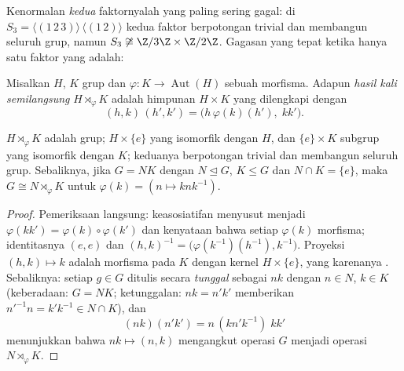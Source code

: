 Kenormalan \emph{kedua} faktornyalah yang paling sering gagal: di $S_3
= \langle (1\,2\,3)\rangle \,\langle(1\,2)\rangle$ kedua faktor
berpotongan trivial dan membangun seluruh grup, namun $S_3 \not\cong \Z/3\Z \times
\Z/2\Z$. Gagasan yang tepat ketika hanya satu faktor yang  adalah:

\begin{definition}\label{def:b3:groups:semidirect}
Misalkan $H$, $K$ grup dan $\varphi \colon K \to
\operatorname{Aut}(H)$ sebuah morfisma. Adapun \emph{hasil kali
semilangsung} $H \rtimes_\varphi K$ adalah
himpunan $H \times K$ yang dilengkapi dengan
\[
(h, k)\,(h', k') = \bigl(h\,\varphi(k)(h'),\; kk'\bigr).
\]
\end{definition}

\begin{proposition}\label{prop:b3:groups:semidirect}
$H \rtimes_\varphi K$ adalah grup; $H \times \{e\}$ 
yang isomorfik dengan $H$, dan $\{e\} \times K$ subgrup yang isomorfik
dengan $K$; keduanya berpotongan trivial dan membangun seluruh grup. Sebaliknya, jika $G =
NK$ dengan $N \trianglelefteq G$, $K \leq G$ dan $N \cap K = \{e\}$,
maka $G \cong N \rtimes_\varphi K$ untuk $\varphi(k) = (n \mapsto
knk^{-1})$.
\end{proposition}

\begin{proof}
Pemeriksaan langsung: keasosiatifan menyusut menjadi $\varphi(kk') =
\varphi(k)\circ\varphi(k')$ dan kenyataan bahwa setiap $\varphi(k)$ morfisma;
identitasnya $(e,e)$ dan $(h,k)^{-1} =
\bigl(\varphi(k^{-1})(h^{-1}), k^{-1}\bigr)$. Proyeksi $(h,k)
\mapsto k$ adalah morfisma pada $K$ dengan kernel $H \times \{e\}$,
yang karenanya . Sebaliknya: setiap $g \in G$ ditulis
secara \emph{tunggal} sebagai $nk$ dengan $n \in N$, $k \in K$ (keberadaan: $G =
NK$; ketunggalan: $nk = n'k'$ memberikan $n'^{-1}n = k'k^{-1} \in N \cap
K$), dan
\[
(nk)(n'k') = n\,(kn'k^{-1})\;kk'
\]
menunjukkan bahwa $nk \mapsto (n, k)$ mengangkut operasi $G$ menjadi operasi
$N \rtimes_\varphi K$.
\end{proof}

